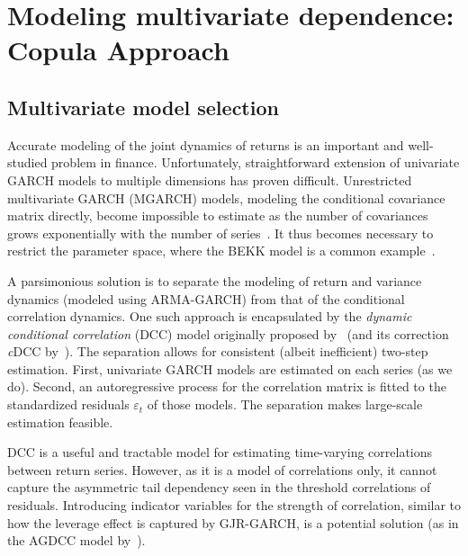
\section{Modeling multivariate dependence: Copula Approach} %
\label{sec:modeling_multivariate_dependence_copula_approach}

\subsection{Multivariate model selection} %
\label{sub:multivariate_model_selection}

Accurate modeling of the joint dynamics of returns is an important and well-studied problem in finance. Unfortunately, straightforward extension of univariate GARCH models to multiple dimensions has proven difficult. Unrestricted multivariate GARCH (MGARCH) models, modeling the conditional covariance matrix directly, become impossible to estimate as the number of covariances grows exponentially with the number of series~\autocite{WhyMGARCHSucks}. It thus becomes necessary to restrict the parameter space, where the BEKK model is a common example~\autocite{BEKKModel}.

A parsimonious solution is to separate the modeling of return and variance dynamics (modeled using ARMA-GARCH) from that of the conditional correlation dynamics. One such approach is encapsulated by the \emph{dynamic conditional correlation} (DCC) model originally proposed by~\autocite{Engle2002} (and its correction \emph{c}DCC by~\autocite{Aielli2013}). The separation allows for consistent (albeit inefficient) two-step estimation. First, univariate GARCH models are estimated on each series (as we do). Second, an autoregressive process for the correlation matrix is fitted to the standardized residuals $\varepsilon_t$ of those models. The separation makes large-scale estimation feasible.

DCC is a useful and tractable model for estimating time-varying correlations between return series. However, as it is a model of correlations only, it cannot capture the asymmetric tail dependency seen in the threshold correlations of residuals. Introducing indicator variables for the strength of correlation, similar to how the leverage effect is captured by GJR-GARCH, is a potential solution (as in the AGDCC model by~\autocite{Cappiello2006}).

